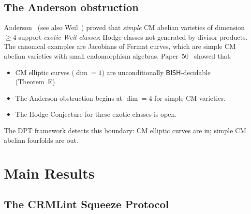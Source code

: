 \documentclass[11pt]{article}
\theoremstyle{plain}
\theoremstyle{definition}
\theoremstyle{remark}
\newcommand{\BISH}{\mathsf{BISH}}
\begin{document}
\subsection{The Anderson obstruction}

Anderson~\cite{Anderson1993} (see also Weil~\cite{Weil1977})
proved that \emph{simple} CM abelian varieties of dimension
$\geq 4$ support \emph{exotic Weil classes}: Hodge classes not
generated by divisor products.  The canonical examples are
Jacobians of Fermat curves, which are simple CM abelian varieties
with small endomorphism algebras.  Paper~50~\cite{Paper50}
showed that:
\begin{itemize}[nosep]
\item CM elliptic curves ($\dim = 1$) are unconditionally
  $\BISH$-decidable (Theorem~E).
\item The Anderson obstruction begins at $\dim = 4$ for
  simple CM varieties.
\item The Hodge Conjecture for these exotic classes is open.
\end{itemize}
The DPT framework detects this boundary: CM elliptic curves are
in; simple CM abelian fourfolds are out.

\section{Main Results}\label{sec:main}

\subsection{The CRMLint Squeeze Protocol}
\end{document}

